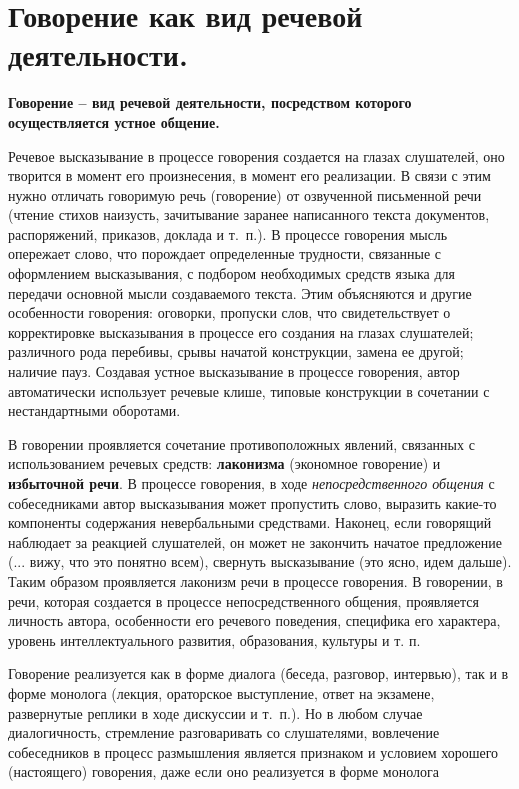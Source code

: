 \section{Говорение как вид речевой деятельности.}

\textbf{Говорение -- вид речевой деятельности, посредством которого осуществляется устное общение.}

Речевое высказывание в процессе говорения создается на глазах слушателей, оно творится в момент его произнесения, в момент его реализации. 
В связи с этим нужно отличать говоримую речь (говорение) от озвученной письменной речи (чтение стихов наизусть, зачитывание заранее написанного текста документов, распоряжений, приказов, доклада и т.~п.).
В процессе говорения мысль опережает слово, что порождает определенные трудности, связанные с оформлением высказывания, с подбором необходимых средств языка для передачи основной мысли создаваемого текста.
Этим объясняются и другие особенности говорения:
оговорки, пропуски слов, что свидетельствует о корректировке высказывания в процессе его создания на глазах слушателей; различного рода перебивы, срывы начатой конструкции, замена ее другой; наличие пауз.
Создавая устное высказывание в процессе говорения, автор автоматически использует речевые клише, типовые конструкции в сочетании с нестандартными оборотами.

В говорении проявляется сочетание противоположных явлений, связанных с использованием речевых средств: \textbf{лаконизма} (экономное говорение) и \textbf{избыточной речи}.
В процессе говорения, в ходе \textit{непосредственного общения }с собеседниками автор высказывания может пропустить слово,  выразить какие-то компоненты содержания невербальными средствами.
Наконец, если говорящий наблюдает за реакцией слушателей, он может не закончить начатое предложение (... вижу, что это понятно всем), свернуть высказывание (это ясно, идем дальше). Таким образом проявляется лаконизм речи в процессе говорения.
В говорении, в речи, которая создается в процессе непосредственного общения, проявляется личность автора, особенности его речевого поведения, специфика его характера, уровень интеллектуального развития, образования, культуры и т. п.

Говорение реализуется как в форме диалога (беседа, разговор, интервью), так и в форме монолога (лекция, ораторское выступление, ответ на экзамене, развернутые реплики в ходе дискуссии и т.~п.).
Но в любом случае диалогичность, стремление разговаривать со слушателями, вовлечение собеседников в процесс размышления является признаком и условием хорошего (настоящего) говорения, даже если оно реализуется в форме монолога